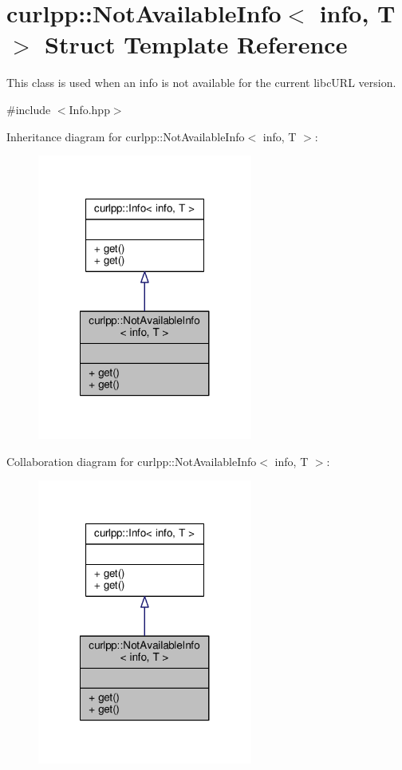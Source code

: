 \hypertarget{structcurlpp_1_1NotAvailableInfo}{\section{curlpp\-:\-:Not\-Available\-Info$<$ info, T $>$ Struct Template Reference}
\label{structcurlpp_1_1NotAvailableInfo}
}


This class is used when an info is not available for the current libc\-U\-R\-L version.  




{\ttfamily \#include $<$Info.\-hpp$>$}



Inheritance diagram for curlpp\-:\-:Not\-Available\-Info$<$ info, T $>$\-:\nopagebreak
\begin{figure}[H]
\begin{center}
\leavevmode
\includegraphics[width=200pt]{structcurlpp_1_1NotAvailableInfo__inherit__graph}
\end{center}
\end{figure}


Collaboration diagram for curlpp\-:\-:Not\-Available\-Info$<$ info, T $>$\-:\nopagebreak
\begin{figure}[H]
\begin{center}
\leavevmode
\includegraphics[width=200pt]{structcurlpp_1_1NotAvailableInfo__coll__graph}
\end{center}
\end{figure}
